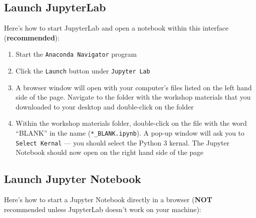 \documentclass[
]{book}
\providecommand{\tightlist}{%
  \setlength{\itemsep}{0pt}\setlength{\parskip}{0pt}}
\begin{document}
\hypertarget{launch-jupyterlab}{%
\subsection{Launch JupyterLab}\label{launch-jupyterlab}}

Here's how to start JupyterLab and open a notebook within this interface (\textbf{recommended}):

\begin{enumerate}
\def\labelenumi{\arabic{enumi}.}
\tightlist
\item
  Start the \texttt{Anaconda\ Navigator} program
\item
  Click the \texttt{Launch} button under \texttt{Jupyter\ Lab}
\item
  A browser window will open with your computer's files listed on the left hand side of the page. Navigate to the folder with the workshop materials that you downloaded to your desktop and double-click on the folder
\item
  Within the workshop materials folder, double-click on the file with the word ``BLANK'' in the name (\texttt{*\_BLANK.ipynb}). A pop-up window will ask you to \texttt{Select\ Kernal} --- you should select the Python 3 kernal. The Jupyter Notebook should now open on the right hand side of the page
\end{enumerate}

\hypertarget{launch-jupyter-notebook}{%
\subsection{Launch Jupyter Notebook}\label{launch-jupyter-notebook}}

Here's how to start a Jupyter Notebook directly in a browser (\textbf{NOT} recommended unless JupyterLab doesn't work on your machine):
\end{document}
